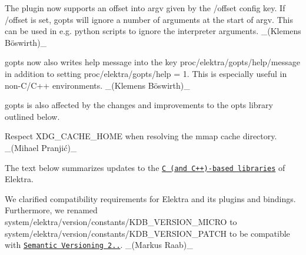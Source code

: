 \begin{DoxyItemize}
\item The plugin now supports an offset into {\ttfamily argv} given by the {\ttfamily /offset} config key. If {\ttfamily /offset} is set, {\ttfamily gopts} will ignore a number of arguments at the start of {\ttfamily argv}. This can be used in e.\+g. python scripts to ignore the interpreter arguments. \+\_\+(Klemens Böswirth)\+\_\+
\item {\ttfamily gopts} now also writes help message into the key {\ttfamily proc/elektra/gopts/help/message} in addition to setting {\ttfamily proc/elektra/gopts/help = 1}. This is especially useful in non-\/\+C/\+C++ environments. \+\_\+(Klemens Böswirth)\+\_\+
\item {\ttfamily gopts} is also affected by the changes and improvements to the {\ttfamily opts} library outlined below.
\end{DoxyItemize}


\begin{DoxyItemize}
\item Respect {\ttfamily X\+D\+G\+\_\+\+C\+A\+C\+H\+E\+\_\+\+H\+O\+ME} when resolving the mmap cache directory. \+\_\+(Mihael Pranjić)\+\_\+
\end{DoxyItemize}

The text below summarizes updates to the \href{https://www.libelektra.org/libraries/readme}{\tt C (and C++)-\/based libraries} of Elektra.


\begin{DoxyItemize}
\item We clarified compatibility requirements for Elektra and its plugins and bindings. Furthermore, we renamed {\ttfamily system/elektra/version/constants/\+K\+D\+B\+\_\+\+V\+E\+R\+S\+I\+O\+N\+\_\+\+M\+I\+C\+RO} to {\ttfamily system/elektra/version/constants/\+K\+D\+B\+\_\+\+V\+E\+R\+S\+I\+O\+N\+\_\+\+P\+A\+T\+CH} to be compatible with \href{https://semver.org/}{\tt Semantic Versioning 2..}. \+\_\+(\+Markus Raab)\+\_\+
\end{DoxyItemize}


